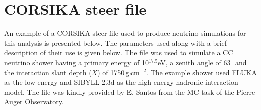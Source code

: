 \chapter{CORSIKA steer file}
\label{sec:app_1}
An example of a CORSIKA steer file used to produce neutrino simulations for this analysis is presented below. The parameters used along with a brief description of their use is given below. The file was used to simulate a CC neutrino shower having a primary energy of 10$^{17.5}$eV, a zenith angle of $63^\circ$ and the interaction slant depth ($X$) of 1750\,g\,cm$^{-2}$. The example shower used FLUKA as the low energy and SIBYLL 2.3d as the high energy hadronic interaction model. The file was kindly provided by E. Santos from the MC task of the Pierre Auger Observatory.

